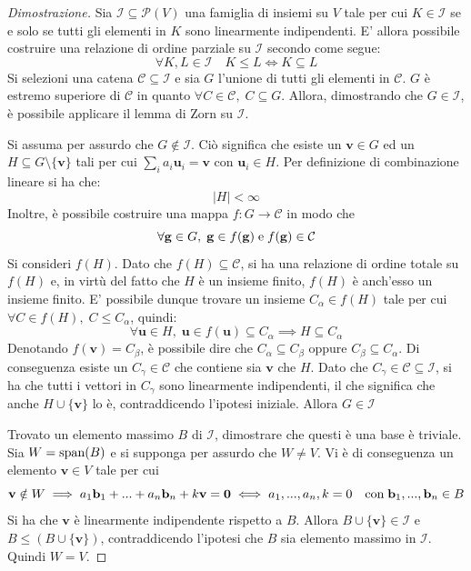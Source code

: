     \begin{proof}[Dimostrazione]
        Sia $\mathcal{I} \subseteq \mathcal{P}(V)$ una famiglia di insiemi su $V$ tale per cui $K \in \mathcal{I}$ se e solo se tutti gli elementi in $K$ sono linearmente indipendenti.
        E' allora possibile costruire una relazione di ordine parziale su $\mathcal{I}$ secondo come segue:
        \[
            \forall K, L \in \mathcal{I} \quad K \leq L \iff K \subseteq L
        \]
        Si selezioni una catena $\mathcal{C} \subseteq \mathcal{I}$ e sia $G$ l'unione di tutti gli elementi in $\mathcal{C}$.
        $G$ è estremo superiore di $\mathcal{C}$ in quanto $\forall C \in \mathcal{C}, \; C \subseteq G$. Allora, dimostrando che $G \in \mathcal{I}$, è possibile applicare il lemma di Zorn su $\mathcal{I}$.

        \vspace{5pt}
        Si assuma per assurdo che $G \notin \mathcal{I}$. Ciò significa che esiste un $\mathbf{v} \in G$ ed un $H \subseteq G \setminus \{\mathbf{v}\}$ tali per cui $\sum_{i} a_{i} \mathbf{u}_{i} = \mathbf{v}$ con $\mathbf{u}_{i} \in H$. Per definizione di combinazione lineare si ha che:
        \[
            |H| < \infty
        \]
        Inoltre, è possibile costruire una mappa $f: G \rightarrow \mathcal{C}$ in modo che
        \[
            \forall \mathbf{g} \in G, \; \mathbf{g} \in f(\mathbf{g}) \; \textnormal{e} \; f(\mathbf{g}) \in \mathcal{C}
        \]
        Si consideri $f(H)$. Dato che $f(H) \subseteq \mathcal{C}$, si ha una relazione di ordine totale su $f(H)$ e, in virtù del fatto che $H$ è un insieme finito, $f(H)$ è anch'esso un insieme finito.
        E' possibile dunque trovare un insieme $C_{\alpha} \in f(H)$ tale per cui $\forall C \in f(H), \; C \leq C_{\alpha}$, quindi:
        \[
            \forall \mathbf{u} \in H, \; \mathbf{u} \in f(\mathbf{u}) \subseteq C_{\alpha} \implies H \subseteq C_{\alpha}
        \]
        Denotando $f(\mathbf{v}) = C_{\beta}$, è possibile dire che $C_{\alpha} \subseteq C_{\beta}$ oppure $C_{\beta} \subseteq C_{\alpha}$. Di conseguenza esiste un $C_{\gamma} \in \mathcal{C}$ che contiene sia $\mathbf{v}$ che $H$. Dato che $C_{\gamma} \in \mathcal{C} \subseteq \mathcal{I}$, si ha che tutti i vettori in $C_{\gamma}$ sono
        linearmente indipendenti, il che significa che anche $H \cup \{\mathbf{v}\}$ lo è, contraddicendo l'ipotesi iniziale. Allora $G \in \mathcal{I}$

        \vspace{10pt}
        Trovato un elemento massimo $B$ di $\mathcal{I}$, dimostrare che questi è una base è triviale. Sia $W = \textnormal{span}(B)$ e si supponga per assurdo che
        $W \neq V$. Vi è di conseguenza un elemento $\mathbf{v} \in V$ tale per cui
        \[
            \mathbf{v} \notin W \implies a_1 \mathbf{b}_{1} + ... + a_n \mathbf{b}_{n} + k \mathbf{v} = \mathbf{0} \iff a_1, ..., a_n, k = 0 \quad \textnormal{con} \; \mathbf{b}_{1}, ..., \mathbf{b}_{n} \in B
        \]
        Si ha che $\mathbf{v}$ è linearmente indipendente rispetto a $B$. Allora $B \cup \{\mathbf{v}\} \in \mathcal{I}$ e $B \leq (B \cup \{\mathbf{v}\})$, contraddicendo l'ipotesi che $B$ sia elemento massimo in $\mathcal{I}$. Quindi $W = V$.


\end{proof}
